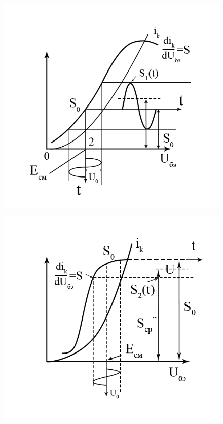 \begin{center}
    \begin{figure}[H]
        \vspace{-10pt}
        \begin{minipage}{0.49\linewidth}
            \includegraphics[width=\linewidth]{circuit/fig4a} 
            \vspace{-50pt}
            \label{fig:4a}
        \end{minipage}
    \begin{minipage}{0.49\linewidth}
        \includegraphics[width=\linewidth]{circuit/fig4b} 
        \vspace{-50pt}
        \label{fig:4b}
    \end{minipage}
    \caption{}
    \label{fig:fig4}
    \vspace{-40pt}
    \end{figure}
\end{center} 

